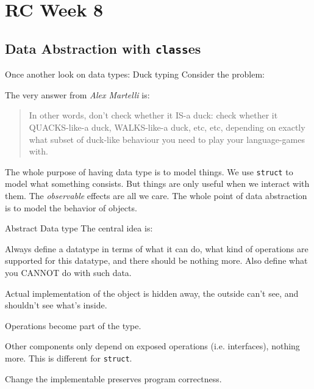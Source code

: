 \section{RC Week 8}
\subsection{Data Abstraction with \texttt{class}es}
\begin{frame}{Once another look on data types: Duck typing}
Consider the problem: 
\begin{center}
\end{center}
The very answer from \textit{Alex Martelli} is:
\begin{quotation}
	In other words, don't check whether it IS-a duck: check whether it QUACKS-like-a duck, WALKS-like-a duck, etc, etc, depending on exactly what subset of duck-like behaviour you need to play your language-games with.
\end{quotation}
The whole purpose of having data type is to model things. We use \texttt{struct} to model what something consists. But things are only useful when we interact with them. The \textit{observable} effects are all we care. \alert{The whole point of data abstraction is to model the behavior of objects}.
\end{frame}

\begin{frame}{Abstract Data type}
The central idea is:
\begin{center}
\end{center}
Always define a datatype in terms of what it can do, what kind of operations are supported for this datatype, and \alert{there should be nothing more}. Also define what you \alert{CANNOT} do with such data.
\begin{description}
	\item[Information Hiding] Actual implementation of the object is hidden away, the outside can't see, and shouldn't see what's inside.
	\item[Encapsulation] Operations become part of the type. 
	\item[Locality] Other components only depend on exposed operations (i.e. interfaces), nothing more. This is different for \texttt{struct}.
	\item[Substitutable] Change the implementable preserves program correctness.
\end{description}
\end{frame}

